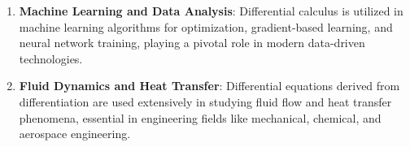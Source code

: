 \begin{enumerate}
    \item \textbf{Machine Learning and Data Analysis}: Differential calculus is utilized in machine learning algorithms for optimization, gradient-based learning, and neural network training, playing a pivotal role in modern data-driven technologies.
    
    \item \textbf{Fluid Dynamics and Heat Transfer}: Differential equations derived from differentiation are used extensively in studying fluid flow and heat transfer phenomena, essential in engineering fields like mechanical, chemical, and aerospace engineering.
\end{enumerate}